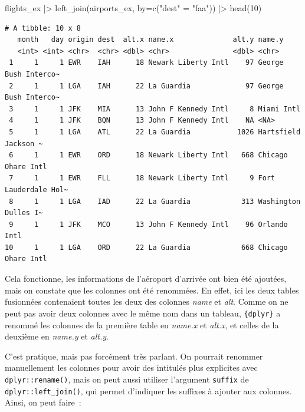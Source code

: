 \documentclass[
  letterpaper,
  DIV=11,
  numbers=noendperiod,
  oneside]{scrreprt}
\newenvironment{Shaded}{\begin{snugshade}}{\end{snugshade}}
\newcommand{\AttributeTok}[1]{\textcolor[rgb]{0.40,0.45,0.13}{#1}}
\newcommand{\DecValTok}[1]{\textcolor[rgb]{0.68,0.00,0.00}{#1}}
\newcommand{\FunctionTok}[1]{\textcolor[rgb]{0.28,0.35,0.67}{#1}}
\newcommand{\NormalTok}[1]{\textcolor[rgb]{0.00,0.23,0.31}{#1}}
\newcommand{\OtherTok}[1]{\textcolor[rgb]{0.00,0.23,0.31}{#1}}
\newcommand{\SpecialCharTok}[1]{\textcolor[rgb]{0.37,0.37,0.37}{#1}}
\newcommand{\StringTok}[1]{\textcolor[rgb]{0.13,0.47,0.30}{#1}}
\begin{document}
\begin{Shaded}
\begin{Highlighting}[]
\NormalTok{flights\_ex }\SpecialCharTok{|\textgreater{}} 
  \FunctionTok{left\_join}\NormalTok{(airports\_ex, }\AttributeTok{by=}\FunctionTok{c}\NormalTok{(}\StringTok{"dest"} \OtherTok{=} \StringTok{"faa"}\NormalTok{)) }\SpecialCharTok{|\textgreater{}} 
  \FunctionTok{head}\NormalTok{(}\DecValTok{10}\NormalTok{)}
\end{Highlighting}
\end{Shaded}

\begin{verbatim}
# A tibble: 10 x 8
   month   day origin dest  alt.x name.x              alt.y name.y              
   <int> <int> <chr>  <chr> <dbl> <chr>               <dbl> <chr>               
 1     1     1 EWR    IAH      18 Newark Liberty Intl    97 George Bush Interco~
 2     1     1 LGA    IAH      22 La Guardia             97 George Bush Interco~
 3     1     1 JFK    MIA      13 John F Kennedy Intl     8 Miami Intl          
 4     1     1 JFK    BQN      13 John F Kennedy Intl    NA <NA>                
 5     1     1 LGA    ATL      22 La Guardia           1026 Hartsfield Jackson ~
 6     1     1 EWR    ORD      18 Newark Liberty Intl   668 Chicago Ohare Intl  
 7     1     1 EWR    FLL      18 Newark Liberty Intl     9 Fort Lauderdale Hol~
 8     1     1 LGA    IAD      22 La Guardia            313 Washington Dulles I~
 9     1     1 JFK    MCO      13 John F Kennedy Intl    96 Orlando Intl        
10     1     1 LGA    ORD      22 La Guardia            668 Chicago Ohare Intl  
\end{verbatim}

Cela fonctionne, les informations de l'aéroport d'arrivée ont bien été
ajoutées, mais on constate que les colonnes ont été renommées. En effet,
ici les deux tables fusionnées contenaient toutes les deux des colonnes
\emph{name} et \emph{alt}. Comme on ne peut pas avoir deux colonnes avec
le même nom dans un tableau, \texttt{\{dplyr\}} a renommé les colonnes
de la première table en \emph{name.x} et \emph{alt.x}, et celles de la
deuxième en \emph{name.y} et \emph{alt.y}.

C'est pratique, mais pas forcément très parlant. On pourrait renommer
manuellement les colonnes pour avoir des intitulés plus explicites avec
\texttt{dplyr::rename()}, mais on peut aussi utiliser l'argument
\texttt{suffix} de \texttt{dplyr::left\_join()}, qui permet d'indiquer
les suffixes à ajouter aux colonnes. Ainsi, on peut faire~:
\end{document}
